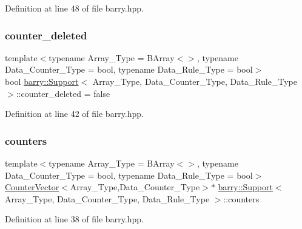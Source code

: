 Definition at line 48 of file barry.\+hpp.

\mbox{\label{classbarry_1_1_support_a5de08029a7262ba86df728c8b8427999}} 
\subsubsection{\texorpdfstring{counter\+\_\+deleted}{counter\_deleted}}
{\footnotesize\ttfamily template$<$typename Array\+\_\+\+Type = B\+Array$<$$>$, typename Data\+\_\+\+Counter\+\_\+\+Type = bool, typename Data\+\_\+\+Rule\+\_\+\+Type = bool$>$ \\
bool \hyperlink{classbarry_1_1_support}{barry\+::\+Support}$<$ Array\+\_\+\+Type, Data\+\_\+\+Counter\+\_\+\+Type, Data\+\_\+\+Rule\+\_\+\+Type $>$\+::counter\+\_\+deleted = false}



Definition at line 42 of file barry.\+hpp.

\mbox{\label{classbarry_1_1_support_ab1d697b1f970b160db6d5f76d602bb3c}} 
\subsubsection{\texorpdfstring{counters}{counters}}
{\footnotesize\ttfamily template$<$typename Array\+\_\+\+Type = B\+Array$<$$>$, typename Data\+\_\+\+Counter\+\_\+\+Type = bool, typename Data\+\_\+\+Rule\+\_\+\+Type = bool$>$ \\
\hyperlink{classbarry_1_1_counter_vector}{Counter\+Vector}$<$Array\+\_\+\+Type,Data\+\_\+\+Counter\+\_\+\+Type$>$$\ast$ \hyperlink{classbarry_1_1_support}{barry\+::\+Support}$<$ Array\+\_\+\+Type, Data\+\_\+\+Counter\+\_\+\+Type, Data\+\_\+\+Rule\+\_\+\+Type $>$\+::counters}



Definition at line 38 of file barry.\+hpp.

\mbox{\label{classbarry_1_1_support_aa69d5a47e5ee039b19f42edacd5453d4}} 
